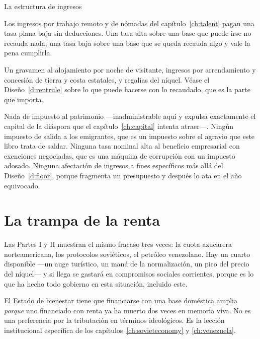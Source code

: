 \begin{design}{La estructura de ingresos}
\begin{rules}
 Los ingresos por trabajo remoto y
de nómadas del capítulo~\ref{ch:talent} pagan una tasa plana baja sin deducciones. Una
tasa alta sobre una base que puede irse no recauda nada; una tasa baja sobre una base
que se queda recauda algo y vale la pena cumplirla.

 Un gravamen al alojamiento por noche de visitante,
ingresos por arrendamiento y concesión de tierra y costa estatales, y regalías del
níquel. Véase el Diseño~\ref{d:rentrule} sobre lo que puede hacerse con lo recaudado,
que es la parte que importa.

 Nada de impuesto al patrimonio ---inadministrable aquí y
expulsa exactamente el capital de la diáspora que el capítulo~\ref{ch:capital} intenta
atraer---. Ningún impuesto de salida a los emigrantes, que es un impuesto sobre el
agravio que este libro trata de saldar. Ninguna tasa nominal alta al beneficio
empresarial con exenciones negociadas, que es una máquina de corrupción con un impuesto
adosado. Ninguna afectación de ingresos a fines específicos más allá del
Diseño~\ref{d:floor}, porque fragmenta un presupuesto y después lo ata en el año
equivocado.
\end{rules}
\end{design}

\section{La trampa de la renta}

Las Partes I y II muestran el mismo fracaso tres veces: la cuota azucarera
norteamericana, los protocolos soviéticos, el petróleo venezolano. Hay un cuarto
disponible ---un auge turístico, un maná de la normalización, un pico del precio del
níquel--- y si llega se gastará en compromisos sociales corrientes, porque es lo que
ha hecho todo gobierno en esta situación, incluido este.

El Estado de bienestar tiene que financiarse con una base doméstica amplia
\emph{porque} uno financiado con renta ya ha muerto dos veces en memoria viva. No es
una preferencia por la tributación en términos ideológicos. Es la lección institucional
específica de los capítulos~\ref{ch:sovieteconomy} y \ref{ch:venezuela}.

